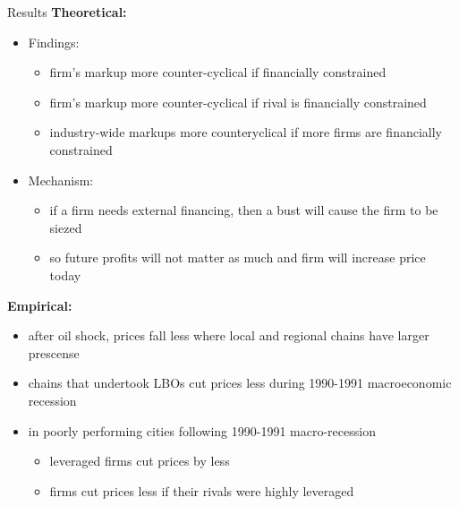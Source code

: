 \documentclass[aspectratio=169]{beamer}
\begin{document}
\begin{frame}{Results}
\textbf{Theoretical:}
\begin{itemize}
    \item Findings:
    \begin{itemize}
        \item firm's markup more counter-cyclical if financially constrained
        \item firm's markup more counter-cyclical if rival is financially constrained
        \item industry-wide markups more counteryclical if more firms are financially constrained
    \end{itemize}
    \item Mechanism:
    \begin{itemize}
        \item if a firm needs external financing, then a bust will cause the firm to be siezed
        \item so future profits will not matter as much and firm will increase price today
    \end{itemize} 
\end{itemize}

\vspace{0.3cm}

\textbf{Empirical:}
\begin{itemize}
    \item after oil shock, prices fall less where local and regional chains have larger prescense
    \item chains that undertook LBOs cut prices less during 1990-1991 macroeconomic recession
    \item in poorly performing cities following 1990-1991 macro-recession
    \begin{itemize}
        \item leveraged firms cut prices by less
        \item firms cut prices less if their rivals were highly leveraged
    \end{itemize}
\end{itemize}

\end{frame}
\end{document}
